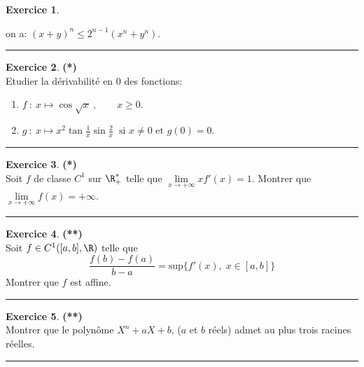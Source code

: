 \documentclass[a4paper,11pt]{article}
\theoremstyle{definition}
\newtheorem{exo}{Exercice} %
\begin{document}
\begin{minipage}{1\linewidth}
\begin{minipage}[t]{0.48\linewidth}
\begin{exo}
\begin{enumerate}
\begin{enumerate}
 			 on a: $ (x + y)^n \leq 2^{n - 1} (x^n + y^n).$
 		\end{enumerate}
 	\end{enumerate}
 	
	\centering
	\rule{1\linewidth}{0.6pt}
\end{exo}

\end{minipage}	
\hfill\vrule\hfill
\begin{minipage}[t]{0.48\linewidth}
\raggedright
\begin{exo}\textbf{(*)}\quad\\[0.2cm]
	Etudier la dérivabilité en $0$ des fonctions:
	\begin{enumerate}
		\item  $f~:~x\mapsto\cos\sqrt{x} \ , \qquad x\geq0$.
		\item  $g~:~x\mapsto x^2\tan\frac{1}{x}\sin\frac{2}{x} \ \text{ si } x\neq 0 \text{ et } g(0)=0$.
	\end{enumerate}
	
	
	
	
	\centering
	\rule{1\linewidth}{0.6pt}
\end{exo}





\begin{exo}\textbf{(*)}\quad\\[0.2cm]
	Soit $f$ de classe $C^1$ sur $\R_+^*$ telle que $\lim\limits_{x\rightarrow +\infty}xf'(x)=1$. 
	Montrer que $\lim\limits_{x\rightarrow +\infty}f(x)=+\infty$.

	
	
	\centering
	\rule{1\linewidth}{0.6pt}
\end{exo}

\begin{exo}\textbf{(**)}\quad\\[0.2cm]
	Soit $f\in C^1([a,b],\R)$ telle que $$\frac{f(b)-f(a)}{b-a}=\mbox{sup}\{f'(x),\;x\in[a,b]\}$$
	Montrer que $f$ est affine.
	
	\centering
	\rule{1\linewidth}{0.6pt}
\end{exo}

\begin{exo}\textbf{(**)}\quad\\[0.2cm]
	
	Montrer que le polyn\^ome $  X^n+aX+b  $,  ($  a  $ et $  b  $ r\' eels) admet au plus trois racines r\' eelles.
	
	\centering
	\rule{1\linewidth}{0.6pt}
\end{exo}


\end{minipage}
\end{minipage}
\end{document}
